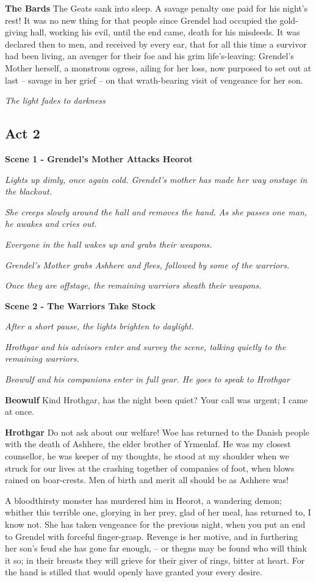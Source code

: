 \documentclass[a4paper]{article}
\begin{document}
{\textbf{The Bards} The Geats sank into sleep. A savage penalty
one paid for his night’s rest! It was no new thing for that people
since Grendel had occupied the gold-giving hall,
working his evil, until the end came,
death for his misdeeds. It was declared then to men,
and received by every ear, that for all this time
a survivor had been living, an avenger for their foe
and his grim life’s-leaving: Grendel’s Mother herself,
a monstrous ogress, ailing for her loss,
now purposed to set out at last – savage in her grief –
on that wrath-bearing visit of vengeance for her son.

\centerline{\textit{The light fades to darkness}}

\subsection{Act 2}%

\centerline{\textbf{Scene 1 - Grendel's Mother Attacks Heorot}}
\centerline{\textit{Lights up dimly, once again cold. Grendel's mother has made her way onstage in the blackout.}}
\centerline{\textit{She creeps slowly around the hall and removes the hand. As she passes one man, he awakes and cries out.}}
\centerline{\textit{Everyone in the hall wakes up and grabs their weapons.}}
\centerline{\textit{Grendel's Mother grabs Ashhere and flees, followed by some of the warriors.}}
\centerline{\textit{Once they are offstage, the remaining warriors sheath their weapons.}}

\centerline{\textbf{Scene 2 - The Warriors Take Stock}}
\centerline{\textit{After a short pause, the lights brighten to daylight.}}
\centerline{\textit{Hrothgar and his advisors enter and survey the scene, talking quietly to the remaining warriors.}}
\centerline{\textit{Beowulf and his companions enter in full gear. He goes to speak to Hrothgar}}

\textbf{Beowulf} Kind Hrothgar, has the night been quiet?
Your call was urgent; I came at once. 

\textbf{Hrothgar} Do not ask about our welfare! Woe has returned
to the Danish people with the death of Ashhere,
the elder brother of Yrmenlaf.
He was my closest counsellor, he was keeper of my thoughts,
he stood at my shoulder when we struck for our lives
at the crashing together of companies of foot,
when blows rained on boar-crests. Men of birth and merit
all should be as Ashhere was!

A bloodthirsty monster has murdered him in Heorot,
a wandering demon; whither this terrible one,
glorying in her prey, glad of her meal,
has returned to, I know not. She has taken vengeance
for the previous night, when you put an end to Grendel
with forceful finger-grasp. Revenge is her motive,
and in furthering her son’s feud she has gone far enough,
– or thegns may be found who will think it so;
in their breasts they will grieve for their giver of rings,
bitter at heart. For the hand is stilled
that would openly have granted your every desire.

}
\end{document}

